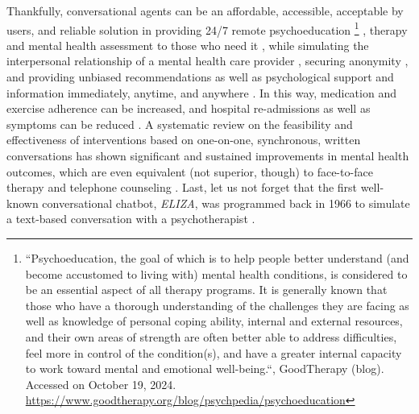 Thankfully, conversational agents can be an affordable, accessible, acceptable by users, and reliable solution in providing 24/7 remote psychoeducation \footnote{   
``Psychoeducation, the goal of which is to help people better understand (and become accustomed to living with) mental health conditions, is considered to be an essential aspect of all therapy programs. It is generally known that those who have a thorough understanding of the challenges they are facing as well as knowledge of personal coping ability, internal and external resources, and their own areas of strength are often better able to address difficulties, feel more in control of the condition(s), and have a greater internal capacity to work toward mental and emotional well-being.``, GoodTherapy (blog). Accessed on October 19, 2024. \url{https://www.goodtherapy.org/blog/psychpedia/psychoeducation}} \cite{schizophrenia2010, panicbot2020, adhd2021}, therapy \cite{dementiatherapy2019, woebot2017, machinesinmentalhealth2017, depressioncoach2023, panicbot2020, adhd2021} and mental health assessment to those who need it \cite{SimCoach2016, mentalhealthbarriers2017, mdddiagnosis2017}, while simulating the interpersonal relationship of a mental health care provider \cite{schizophrenia2010, mentalhealthbarriers2017}, securing anonymity \cite{mentalhealthbarriers2017, wysa2023}, and providing unbiased recommendations \cite{alcoholism2016} as well as psychological support and information immediately, anytime, and anywhere \cite{schizophrenia2010, reviewmental2017, woebot2017, machinesinmentalhealth2017, noblesetal2020addiction, depressioncoach2023, smokingcessation2017, smokingcessation2019}. In this way, medication and exercise adherence can be increased, and hospital re-admissions as well as symptoms can be reduced \cite{schizophrenia2010}. A systematic review on the feasibility and effectiveness of interventions based on one-on-one, synchronous, written conversations has shown significant and sustained improvements in mental health outcomes, which are even equivalent (not superior, though) to face-to-face therapy and telephone counseling \cite{reviewmental2017}. Last, let us not forget that the first well-known conversational chatbot, \textit{ELIZA}, was programmed back in 1966 to simulate a text-based conversation with a psychotherapist \cite{eliza1966}.

